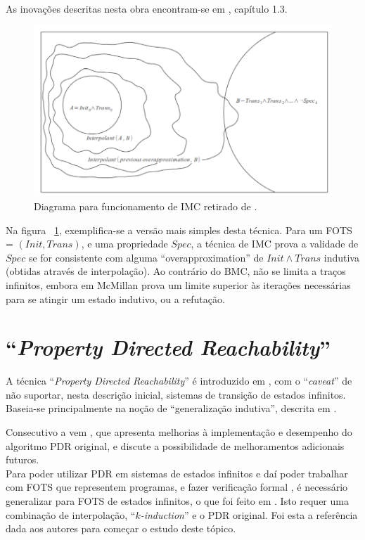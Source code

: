 \documentclass[11pt,a4paper]{report}%
\def\pdr{``\textit{Property Directed Reachability}''\xspace}
\def\kind{``\textit{$k$-induction}''\xspace}
\begin{document}
As inovações descritas nesta obra encontram-se em \cite{interpolation_thesis}, capítulo 1.3.

\begin{figure}[H]
      \centering
      \includegraphics[scale=1]{imc_example.png}
      \caption{Diagrama para funcionamento de IMC retirado de \cite[p. 17] {bachelor_thesis}.}
      \label{fig:imc}
\end{figure}

Na figura ~\ref{fig:imc}, exemplifica-se a versão mais simples desta técnica.
Para um FOTS = $(Init, Trans)$, e uma propriedade $Spec$, a técnica de IMC
prova a validade de $Spec$ se for consistente com alguma ``overapproximation'' de
$Init \land Trans$ indutiva (obtidas através de interpolação).
Ao contrário do BMC, não se limita a traços infinitos, embora em  \cite{interpolation_original}
McMillan prova um limite superior às iterações necessárias para se atingir um
estado indutivo, ou a refutação.

\section{\pdr}
\label{state_of_art:pdr}

A técnica \pdr é introduzido em \cite{pdr_original}, com o ``\textit{caveat}'' de não
suportar, nesta descrição inicial, sistemas de transição de estados infinitos.
Baseia-se principalmente na noção de ``generalização indutiva'', descrita em
\cite{inductive_general}.

Consecutivo a \cite{pdr_original} vem \cite{pdr_efficient}, que apresenta melhorias
à implementação e desempenho do algoritmo PDR original, e discute a possibilidade de
melhoramentos adicionais futuros.\\

Para poder utilizar PDR em sistemas de estados infinitos \textemdash e daí poder trabalhar
com FOTS que representem programas, e fazer verificação formal \textemdash, é necessário
generalizar para FOTS de estados infinitos, o que foi feito em \cite{pdr_state_of_art}.
Isto requer uma combinação de interpolação, \kind e o PDR original.
Foi esta a referência dada aos autores para começar o estudo deste tópico.
\end{document}
